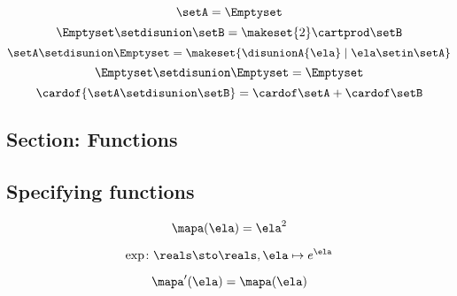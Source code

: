 {\begin{forslides}
\begin{equation}
            \label{eq:slides_session2_71}
            \setA = \Emptyset
        \end{equation}
        \begin{equation}
            \label{eq:slides_session2_72}
            \Emptyset \setdisunion \setB =  \makeset{2} \cartprod \setB
        \end{equation}
        \begin{equation}
            \label{eq:slides_session2_73}
            \setA \setdisunion \Emptyset =  \makeset{ \disunionA{\ela} \mid \ela \setin\setA }
        \end{equation}
        \begin{equation}
            \label{eq:slides_session2_74}
            \Emptyset \setdisunion \Emptyset = \Emptyset
        \end{equation}
        \begin{equation}
            \label{eq:slides_session2_75}
            \cardof{ \setA \setdisunion \setB}  = \cardof \setA  + \cardof \setB
        \end{equation}

        \subsection{Section: Functions}

        \subsection{Specifying functions}

        \begin{equation}
            \label{eq:slides_session2_76}
            \mapa(\ela)=\ela^2
        \end{equation}

        \begin{equation}
            \label{eq:slides_session2_77}
            \exp \colon \reals \sto \reals, \ela \mapsto e^{\ela}
        \end{equation}

        \begin{equation}
            \label{eq:slides_session2_78}
            \mapa'(\ela) = \mapa(\ela)
        \end{equation}


\end{forslides}}
